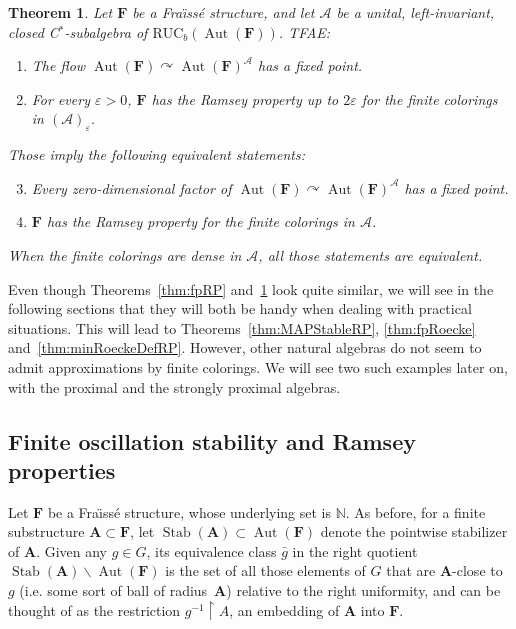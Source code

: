 \documentclass[11pt]{article}
\newtheorem{theo}{Theorem}[section]
\theoremstyle{definition}
\numberwithin{equation}{section}
\numberwithin{figure}{section}
\numberwithin{table}{section}
\newcommand{\A}{\mathcal A}
\newcommand{\N}{\mathbb{N}}
\newcommand*{\mA}{\mathbf{A}}
\newcommand*{\mF}{\mathbf{F}}
\newcommand{\restrict}[2]{#1 \upharpoonright #2}
\newcommand{\e}{\varepsilon}
\DeclareMathOperator{\Aut}{Aut}
\DeclareMathOperator{\Stab}{Stab}
\newcommand{\actson}{\curvearrowright}
\newcommand{\RUCB}{\mathrm{RUC}_{b}}
\begin{document}
\begin{theo}\label{thm:fpRPcpct}
Let $\mF$ be a Fra\"{\i}ss\'e structure, and let $\A$ be a unital, left-invariant, closed C$^{*}$-subalgebra of $\RUCB(\Aut(\mF))$. TFAE:
\begin{enumerate}
\item \label{3.1.1} The flow $\Aut(\mF)\actson \Aut(\mF)^{\A}$ has a fixed point.
\item \label{3.1.2} For every $\e>0$, $\mF$ has the Ramsey property up to $2\e$ for the finite colorings in $(\A)_{\e}$.
\end{enumerate}

Those imply the following equivalent statements:
\begin{enumerate}
\setcounter{enumi}{2}
\item \label{3.1.3} Every zero-dimensional factor of $\Aut(\mF)\actson \Aut(\mF)^{\A}$ has a fixed point.
\item \label{3.1.4} $\mF$ has the Ramsey property for the finite colorings in $\A$.
\end{enumerate}

When the finite colorings are dense in $\A$, all those statements are equivalent.
\end{theo}

Even though Theorems~\ref{thm:fpRP} and~\ref{thm:fpRPcpct} look quite similar, we will see in the following sections that they will both be handy when dealing with practical situations. This will lead to Theorems~\ref{thm:MAPStableRP}, \ref{thm:fpRoecke} and~\ref{thm:minRoeckeDefRP}. However, other natural algebras do not seem to admit approximations by finite colorings. We will see two such examples later on, with the proximal and the strongly proximal algebras.

\subsection{Finite oscillation stability and Ramsey properties}
\label{section:colorings}

Let $\mF$ be a Fra\"{\i}ss\'e structure, whose underlying set is $\N$. As before, for a finite substructure $\mA \subset \mF$, let $\Stab(\mA) \subset \Aut(\mF)$ denote the pointwise stabilizer of $\mA$. Given any $g\in G$, its equivalence class $\bar g$ in the right quotient $\Stab(\mA)\backslash \Aut(\mF)$ is the set of all those elements of $G$ that are $\mA$-close to $g$ (i.e. some sort of ball of radius~$\mA$) relative to the right uniformity, and can be thought of as the restriction $\restrict{g^{-1}}{A}$, an embedding of $\mA$ into $\mF$.
\end{document}
